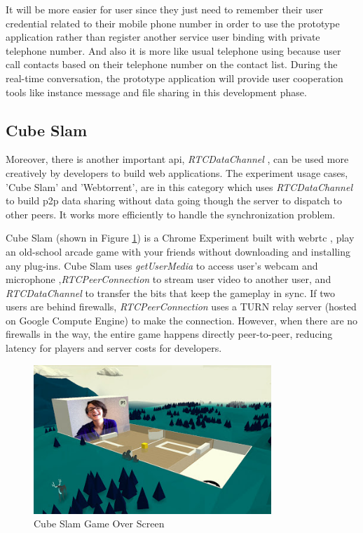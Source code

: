 It will be more easier for user since they just need to remember their user credential related to their mobile phone number in order to use the prototype application rather than register another service user binding with private telephone number. And also it is more like usual telephone using because user call contacts based on their telephone number on the contact list. During the real-time conversation, the prototype application will provide user cooperation tools like instance message and file sharing in this development phase.

\subsection{Cube Slam}

\noindent Moreover, there is another important \gls{api}, \textit{RTCDataChannel} , can be used more creatively by developers to build web applications. The experiment usage cases, 'Cube Slam' and 'Webtorrent', are in this category which uses \textit{RTCDataChannel} to build \gls{p2p} data sharing without data going though the server to dispatch to other peers. It works more efficiently to handle the synchronization problem.

\par Cube Slam (shown in Figure \ref{fig:cube_slam}) is a Chrome Experiment built with \gls{webrtc} , play an old-school arcade game with your friends without downloading and installing any plug-ins. Cube Slam uses \textit{getUserMedia} to access user's webcam and microphone ,\textit{RTCPeerConnection} to stream user video to another user, and \textit{RTCDataChannel} to transfer the bits that keep the gameplay in sync. If two users are behind firewalls, \textit{RTCPeerConnection} uses a TURN  relay server (hosted on Google Compute Engine) to make the connection. However, when there are no firewalls in the way, the entire game happens directly peer-to-peer, reducing latency for players and server costs for developers.\cite{chrome:cube_slam}

\begin{figure}
	\centering
    	\includegraphics[width=0.8\textwidth,natwidth=610,natheight=642]{figs/cube_slam.jpg}
  	\caption{Cube Slam Game Over Screen}
  	\label{fig:cube_slam}
\end{figure}

